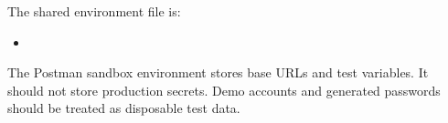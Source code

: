 The shared environment file is:

\begin{itemize}
  \item {}
\end{itemize}

The Postman sandbox environment stores base URLs and test variables. It should
not store production secrets. Demo accounts and generated passwords should be
treated as disposable test data.
